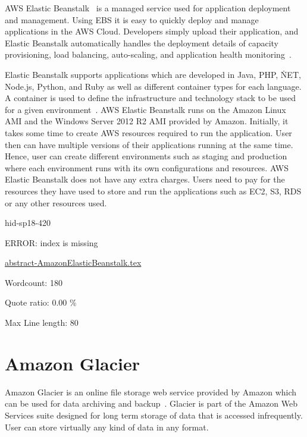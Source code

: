 AWS Elastic Beanstalk~\cite{hid-sp18-420-amazon-elastic-beanstalk} is a managed
service used for application deployment and management. Using EBS it is easy to
quickly deploy and manage applications in the AWS Cloud. Developers simply
upload their application, and Elastic Beanstalk automatically handles the
deployment details of capacity provisioning, load balancing, auto-scaling, and
application health monitoring~\cite{hid-sp18-420-amazon-elastic-beanstalk-FAQ}.

Elastic Beanstalk supports applications which are developed in Java, PHP, \.NET,
Node.js, Python, and Ruby as well as different container types for each
language. A container is used to define the infrastructure and technology stack
to be used for a given
environment~\cite{hid-sp18-420-amazon-elastic-beanstalk-FAQ}. AWS Elastic
Beanstalk runs on the Amazon Linux AMI and the Windows Server 2012 R2 AMI
provided by Amazon. Initially, it takes some time to create AWS resources
required to run the application. User then can have multiple versions of their
applications running at the same time. Hence, user can create different
environments such as staging and production where each environment runs with its
own configurations and resources. AWS Elastic Beanstalk does not have any extra
charges. Users need to pay for the resources they have used to store and run the
applications such as EC2, S3, RDS or any other resources used.


\begin{IU}

hid-sp18-420

ERROR: index is missing

\href{https://github.com/cloudmesh-community/hid-sp18-420/blob/master//technology/abstract-AmazonElasticBeanstalk.tex}{abstract-AmazonElasticBeanstalk.tex}

 

Wordcount: 180


Quote ratio: 0.00 \%
 
Max Line length: 80
\end{IU}

\section{Amazon Glacier}

Amazon Glacier is an online file storage web service provided by Amazon which
can be used for data archiving and backup~\cite{hid-sp18-420-Amazon-Glacier}.
Glacier is part of the Amazon Web Services suite designed for long term storage
of data that is accessed infrequently. User can store virtually any kind of data
in any format.

